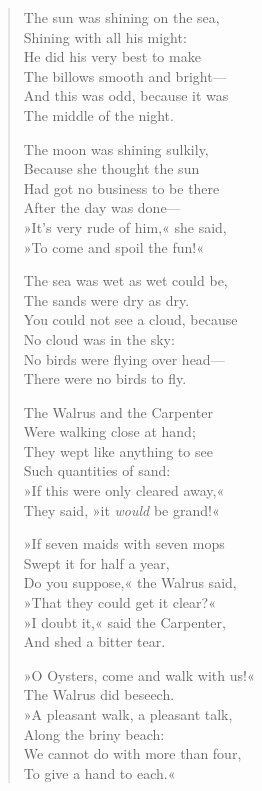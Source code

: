 \begin{verse}
The sun was shining on the sea,\\
\vin Shining with all his might:\\
He did his very best to make\\
\vin The billows smooth and bright—\\
And this was odd, because it was\\
\vin The middle of the night.

The moon was shining sulkily,\\
\vin Because she thought the sun\\
Had got no business to be there\\
\vin After the day was done—\\
»It's very rude of him,« she said,\\
\vin »To come and spoil the fun!«

\enlargethispage{\baselineskip}
The sea was wet as wet could be,\\
\vin The sands were dry as dry.\\
You could not see a cloud, because\\
\vin No cloud was in the sky:\\
No birds were flying over head—\\
\vin There were no birds to fly.

The Walrus and the Carpenter\\
\vin Were walking close at hand;\\
They wept like anything to see\\
\vin Such quantities of sand:\\
»If this were only cleared away,«\\
\vin They said, »it \textit{would} be grand!«

»If seven maids with seven mops\\
\vin Swept it for half a year,\\
Do you suppose,« the Walrus said,\\
\vin »That they could get it clear?«\\
»I doubt it,« said the Carpenter,\\
\vin And shed a bitter tear.

»O Oysters, come and walk with us!«\\
\vin The Walrus did beseech.\\
»A pleasant walk, a pleasant talk,\\
\vin Along the briny beach:\\
We cannot do with more than four,\\
\vin To give a hand to each.«


\end{verse}
